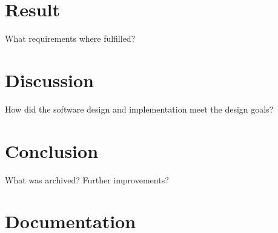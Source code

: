 \documentclass[main.tex]{subfiles}
\begin{document}
\section{Result}
What requirements where fulfilled?

\section{Discussion}
How did the software design and implementation meet the design goals?

\section{Conclusion}
What was archived?
Further improvements?

\appendix
\section{Documentation}
\end{document}
